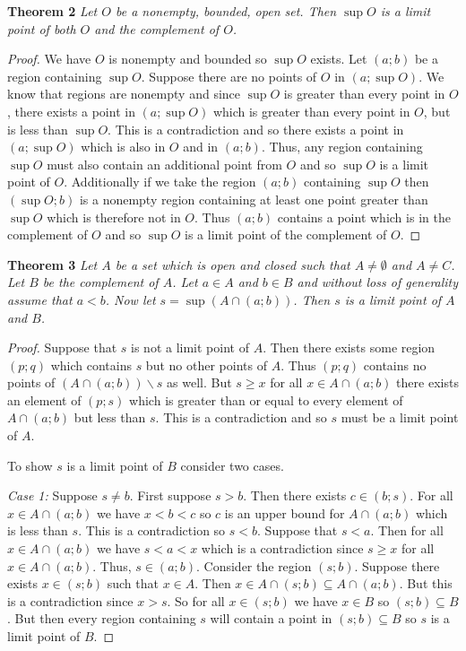 \documentclass{article}
\begin{document}
\begin{flushleft}
\textbf{Theorem 2}
\textsl{Let $O$ be a nonempty, bounded, open set. Then $\sup O$ is a limit point of both $O$ and the complement of $O$.}
\begin{proof}
We have $O$ is nonempty and bounded so $\sup O$ exists. Let $(a;b)$ be a region containing $\sup O$. Suppose there are no points of $O$ in $(a;\sup O)$. We know that regions are nonempty and since $\sup O$ is greater than every point in $O$, there exists a point in $(a; \sup O)$ which is greater than every point in $O$, but is less than $\sup O$. This is a contradiction and so there exists a point in $(a; \sup O)$ which is also in $O$ and in $(a;b)$. Thus, any region containing $\sup O$ must also contain an additional point from $O$ and so $\sup O$ is a limit point of $O$. Additionally if we take the region $(a;b)$ containing $\sup O$ then $(\sup O;b)$ is a nonempty region containing at least one point greater than $\sup O$ which is therefore not in $O$. Thus $(a;b)$ contains a point which is in the complement of $O$ and so $\sup O$ is a limit point of the complement of $O$.
\end{proof}

\textbf{Theorem 3}
\textsl{Let $A$ be a set which is open and closed such that $A \neq \emptyset$ and $A \neq C$. Let $B$ be the complement of $A$. Let $a \in A$ and $b \in B$ and without loss of generality assume that $a < b$. Now let $s = \sup (A \cap (a;b))$. Then $s$ is a limit point of $A$ and $B$.}
\begin{proof}
Suppose that $s$ is not a limit point of $A$. Then there exists some region $(p;q)$ which contains $s$ but no other points of $A$. Thus $(p;q)$ contains no points of $(A \cap (a;b)) \backslash s$ as well. But $s \geq x$ for all $x \in A \cap (a;b)$ there exists an element of $(p;s)$ which is greater than or equal to every element of $A \cap (a;b)$ but less than $s$. This is a contradiction and so $s$ must be a limit point of $A$.\newline

To show $s$ is a limit point of $B$ consider two cases.\newline

\textit{Case 1:} Suppose $s \neq b$. First suppose $s>b$. Then there exists $c \in (b;s)$. For all $x \in A \cap (a;b)$ we have $x < b < c$ so $c$ is an upper bound for $A \cap (a;b)$ which is less than $s$. This is a contradiction so $s<b$. Suppose that $s<a$. Then for all $x \in A \cap (a;b)$ we have $s<a<x$ which is a contradiction since $s \geq x$ for all $x \in A \cap (a;b)$. Thus, $s \in (a;b)$. Consider the region $(s;b)$. Suppose there exists $x \in (s;b)$ such that $x \in A$. Then $x \in A \cap (s;b) \subseteq A \cap (a;b)$. But this is a contradiction since $x > s$. So for all $x \in (s;b)$ we have $x \in B$ so $(s;b) \subseteq B$. But then every region containing $s$ will contain a point in $(s;b) \subseteq B$ so $s$ is a limit point of $B$.\newline


\end{proof}
\end{flushleft}
\end{document}
